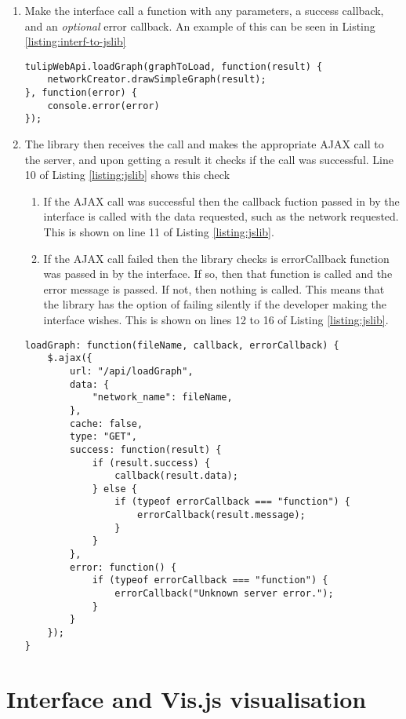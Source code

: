 \documentclass[../dissertation.tex]{subfiles}
\begin{document}
\begin{enumerate}
    \item Make the interface call a function with any parameters, a success callback, and an \emph{optional} error callback. An example of this can be seen in Listing \ref{listing:interf-to-jslib}
    \begin{lstlisting}[caption=How the interface would call the JavaScript library, label=listing:interf-to-jslib]
tulipWebApi.loadGraph(graphToLoad, function(result) {
	networkCreator.drawSimpleGraph(result);
}, function(error) {
	console.error(error)
});
    \end{lstlisting}
    \item The library then receives the call and makes the appropriate AJAX call to the server, and upon getting a result it checks if the call was successful. Line 10 of Listing \ref{listing:jslib} shows this check
    \begin{enumerate}
        \item If the AJAX call was successful then the callback fuction passed in by the interface is called with the data requested, such as the network requested. This is shown on line 11 of Listing \ref{listing:jslib}.
        \item If the AJAX call failed then the library checks is errorCallback function was passed in by the interface. If so, then that function is called and the error message is passed. If not, then nothing is called. This means that the library has the option of failing silently if the developer making the interface wishes. This is shown on lines 12 to 16 of Listing \ref{listing:jslib}.
    \end{enumerate}
    \begin{lstlisting}[caption=How the JavaScript library catches and passes errors, label=listing:jslib]
loadGraph: function(fileName, callback, errorCallback) {
	$.ajax({
		url: "/api/loadGraph",
		data: {
	        "network_name": fileName,
	    },
	    cache: false,
	    type: "GET",
		success: function(result) {
			if (result.success) {
        		callback(result.data);
			} else {
				if (typeof errorCallback === "function") {
					errorCallback(result.message);
				}
			}
        },
		error: function() {
			if (typeof errorCallback === "function") {
				errorCallback("Unknown server error.");
			}
        }
    });
}
\end{lstlisting}
\end{enumerate}

\section{Interface and Vis.js visualisation}
\end{document}
